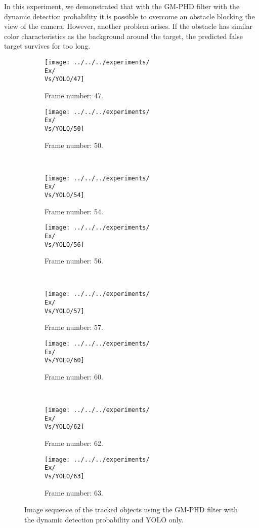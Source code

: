 In this experiment, we demonstrated that with the GM-PHD filter with the dynamic detection probability it is possible
to overcome an obstacle blocking the view of the camera. However, another problem arises. If the obstacle has similar color characteristics as the background around the target, the predicted false target survives for too long.
\begin{figure}[H]
    \centering
    \begin{subfigure}{0.48\textwidth}
        \centering
        \texttt{[image: ../../../experiments/\\Ex/\\Vs/YOLO/47]}
        \caption{Frame number: 47.}
        \label{fig:\Ex-\Vs-\Set:01}
    \end{subfigure}
    \begin{subfigure}{0.48\textwidth}
        \centering
        \texttt{[image: ../../../experiments/\\Ex/\\Vs/YOLO/50]}
        \caption{Frame number: 50.}
        \label{fig:\Ex-\Vs-\Set:02}
    \end{subfigure}
    \\
    \begin{subfigure}{0.48\textwidth}
        \centering
        \texttt{[image: ../../../experiments/\\Ex/\\Vs/YOLO/54]}
        \caption{Frame number: 54.}
        \label{fig:\Ex-\Vs-\Set:03}
    \end{subfigure}
    \begin{subfigure}{0.48\textwidth}
        \centering
        \texttt{[image: ../../../experiments/\\Ex/\\Vs/YOLO/56]}
        \caption{Frame number: 56.}
        \label{fig:\Ex-\Vs-\Set:04}
    \end{subfigure}
    \\
    \begin{subfigure}{0.48\textwidth}
        \centering
        \texttt{[image: ../../../experiments/\\Ex/\\Vs/YOLO/57]}
        \caption{Frame number: 57.}
        \label{fig:\Ex-\Vs-\Set:05}
    \end{subfigure}
    \begin{subfigure}{0.48\textwidth}
        \centering
        \texttt{[image: ../../../experiments/\\Ex/\\Vs/YOLO/60]}
        \caption{Frame number: 60.}
        \label{fig:\Ex-\Vs-\Set:06}
    \end{subfigure}
    \\
    \begin{subfigure}{0.48\textwidth}
        \centering
        \texttt{[image: ../../../experiments/\\Ex/\\Vs/YOLO/62]}
        \caption{Frame number: 62.}
        \label{fig:\Ex-\Vs-\Set:07}
    \end{subfigure}
    \begin{subfigure}{0.48\textwidth}
        \centering
        \texttt{[image: ../../../experiments/\\Ex/\\Vs/YOLO/63]}
        \caption{Frame number: 63.}
        \label{fig:\Ex-\Vs-\Set:08}
    \end{subfigure}
    \caption{Image sequence of the tracked objects using the GM-PHD filter with the dynamic detection probability and
    YOLO only.}
    \label{fig:\Ex-\Vs-\Set}
\end{figure}

